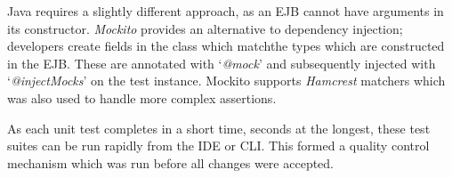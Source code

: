 \par
Java requires a slightly different approach, as an EJB cannot have arguments in its constructor. \textit{Mockito}\cite{Mockito} provides an alternative to dependency injection; developers create fields in the class which matchthe  types which are constructed in the EJB. These are annotated with `\textit{@mock}' and subsequently injected with `\textit{@injectMocks}' on the test instance. Mockito supports \textit{Hamcrest}\cite{Hamcrest} matchers which was also used to handle more complex assertions.

\par
As each unit test completes in a short time, seconds at the longest, these test suites can be run rapidly from the IDE or CLI. This formed a quality control mechanism which was run before all changes were accepted.
